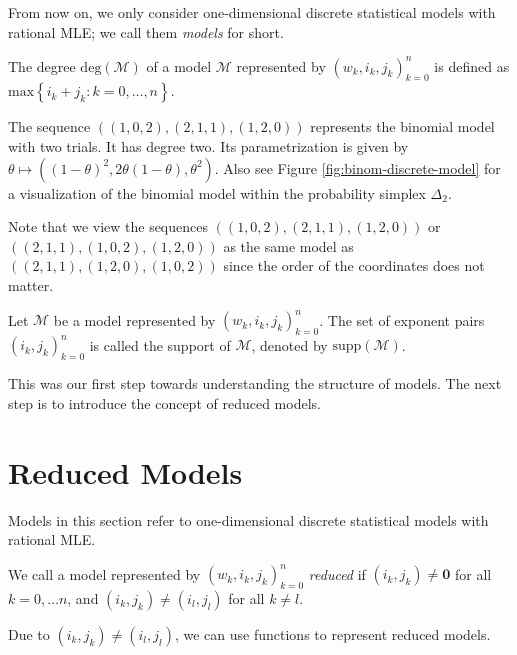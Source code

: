 From now on, we only consider one-dimensional discrete statistical models with rational MLE; we call them \emph{models} for short.

\begin{definition}
    The degree \( \mathrm{deg}(\mathcal{M}) \) of a model \( \mathcal{M} \) represented by \( (w_k, i_k, j_k)_{k=0}^n \) is defined as \( \mathrm{max}\left\{ i_k + j_k : k = 0, \dots, n \right\} \).
\end{definition}

\begin{example}
    The sequence \( ((1,0,2), (2,1,1), (1,2,0)) \) represents the binomial model with two trials. It has degree two. Its parametrization is given by \( \theta \mapsto ((1-\theta)^2, 2\theta(1-\theta),\theta^2) \). Also see Figure \ref{fig:binom-discrete-model} for a visualization of the binomial model within the probability simplex \( \Delta_2 \).

    Note that we view the sequences \( ((1,0,2), (2,1,1), (1,2,0)) \) or \( ((2,1,1), (1,0,2), (1,2,0)) \) as the same model as \( ((2,1,1), (1,2,0), (1,0,2)) \) since the order of the coordinates does not matter.
\end{example}

\begin{definition}
    Let \( \mathcal{M} \) be a model represented by \( (w_k, i_k, j_k)_{k=0}^n \). The set of exponent pairs \( (i_k, j_k)_{k=0}^n \) is called the support of \( \mathcal{M} \), denoted by \( \mathrm{supp}(\mathcal{M}) \).
\end{definition}

This was our first step towards understanding the structure of models. The next step is to introduce the concept of reduced models.

\section{Reduced Models}

Models in this section refer to one-dimensional discrete statistical models with rational MLE.

\begin{definition}
    We call a model represented by \( (w_k, i_k, j_k)_{k=0}^n \) \emph{reduced} if \( (i_k, j_k) \neq \mathbf 0 \) for all \( k = 0, \dots n \), and \( (i_k, j_k) \neq (i_l, j_l) \) for all \( k \neq l \).
\end{definition}

Due to \( (i_k, j_k) \neq (i_l, j_l) \), we can use functions to represent reduced models.

